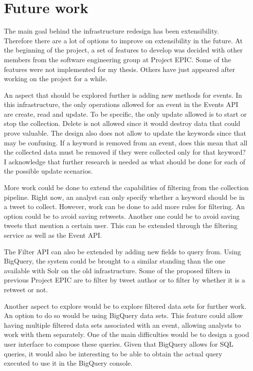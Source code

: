 \chapter{Future work}

The main goal behind the infrastructure redesign has been extensibility. Therefore there are a lot of options to improve on extensibility in the future. At the beginning of the project, a set of features to develop was decided with other members from the software engineering group at Project EPIC. Some of the features were not implemented for my thesis. Others have just appeared after working on the project for a while.

An aspect that should be explored further is adding new methods for events. In this infrastructure, the only operations allowed for an event in the Events API are create, read and update. To be specific, the only update allowed is to start or stop the collection. Delete is not allowed since it would destroy data that could prove valuable. The design also does not allow to update the keywords since that may be confusing. If a keyword is removed from an event, does this mean that all the collected data must be removed if they were collected only for that keyword? I acknowledge that further research is needed as what should be done for each of the possible update scenarios.

More work could be done to extend the capabilities of filtering from the collection pipeline. Right now, an analyst can only specify whether a keyword should be in a tweet to collect. However, work can be done to add more rules for filtering. An option could be to avoid saving retweets. Another one could be to avoid saving tweets that mention a certain user. This can be extended through the filtering service as well as the Event API.

The Filter API can also be extended by adding new fields to query from. Using BigQuery, the system could be brought to a similar standing than the one available with Solr on the old infrastructure. Some of the proposed filters in previous Project EPIC are to filter by tweet author or to filter by whether it is a retweet or not. 

Another aspect to explore would be to explore filtered data sets for further work. An option to do so would be using BigQuery data sets. This feature could allow having multiple filtered data sets associated with an event, allowing analysts to work with them separately. One of the main difficulties would be to design a good user interface to compose these queries. Given that BigQuery allows for SQL queries, it would also be interesting to be able to obtain the actual query executed to use it in the BigQuery console. 

